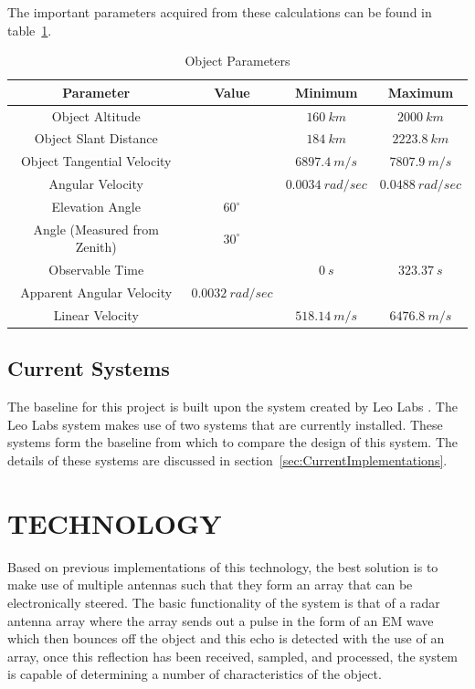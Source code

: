 \documentclass[11pt]{witseiepaper}
\begin{document}
\begin{bibunit}[witseie]
The important parameters acquired from these calculations can be found in table~\ref{tab:ImportantObjectParameters}.

\begin{table}
    \caption{Object Parameters}
    \label{tab:ImportantObjectParameters}
    \begin{center}
        \begin{tabular}{c c c c}
            \hline 
            Parameter & Value & Minimum & Maximum \\
            \hline
            Object Altitude & & $160~km$ & $2000~km$ \\
            Object Slant Distance & & $184~km$ & $2223.8~km$ \\
            Object Tangential Velocity & & $6897.4~m/s$ & $7807.9~m/s$ \\
            Angular Velocity & & $0.0034~rad/sec$ & $0.0488~rad/sec$ \\
            Elevation Angle & $60^{\circ}$ & &  \\
            Angle (Measured from Zenith) & $30^{\circ}$ & &  \\
            Observable Time & & $0~s$ & $323.37~s$ \\
            Apparent Angular Velocity & $0.0032~rad/sec$ & & \\
            Linear Velocity & &  $518.14~m/s$ & $6476.8~m/s$ \\
        \end{tabular}
    \end{center}
\end{table}

\subsection{Current Systems} \label{sec:CurrentSystems}
The baseline for this project is built upon the system created by Leo Labs \cite{LEOLABS}. The Leo Labs system makes use of two systems that are currently installed. These systems form the baseline from which to compare the design of this system. The details of these systems are discussed in section~\ref{sec:CurrentImplementations}.


\section{TECHNOLOGY} \label{sec:TECHNOLOGY}
Based on previous implementations of this technology, the best solution is to make use of multiple antennas such that they form an array that can be electronically steered.
The basic functionality of the system is that of a radar antenna array where the array sends out a pulse in the form of an EM wave which then bounces off the object and this echo is detected with the use of an array, once this reflection has been received, sampled, and processed, the system is capable of determining a number of characteristics of the object.


\end{bibunit}
\end{document}
